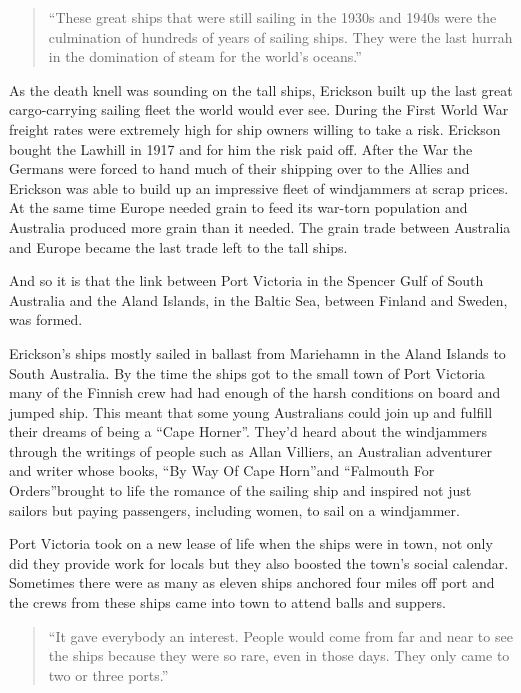 \documentclass[
  11pt,
  msmallroyalvopaper
]{memoir}
\begin{document}
\begin{quote}
“These great ships that were still sailing in the 1930s and 1940s were the culmination of
hundreds of years of sailing ships. They were the last hurrah in the domination of steam
for the world’s oceans.” 
\end{quote}

As the death knell was sounding on the tall ships, Erickson built up the
last great cargo-carrying sailing fleet the world would ever see.
During the First World War freight rates were extremely high for ship
owners willing to take a risk. Erickson bought the Lawhill in 1917 and
for him the risk paid off. After the War the Germans were forced to hand
much of their shipping over to the Allies and Erickson was able to build
up an impressive fleet of windjammers at scrap prices. At the same time
Europe needed grain to feed its war-torn population and Australia
produced more grain than it needed. The grain trade between Australia
and Europe became the last trade left to the tall ships.

And so it is that the link between Port Victoria in the Spencer Gulf of
South Australia and the Aland Islands, in the Baltic Sea, between
Finland and Sweden, was formed.

Erickson’s ships mostly sailed in ballast from Mariehamn in the Aland
Islands to South Australia. By the time the ships got to the small town
of Port Victoria many of the Finnish crew had had enough of the harsh
conditions on board and jumped ship. This meant that some young
Australians could join up and fulfill their dreams of being a “Cape
Horner”. They’d heard about the windjammers through the writings of
people such as Allan Villiers, an Australian adventurer and writer whose
books, “By Way Of Cape Horn”and “Falmouth For Orders”brought to life the
romance of the sailing ship and inspired not just sailors but paying
passengers, including women, to sail on a windjammer.

Port Victoria took on a new lease of life when the ships were in town,
not only did they provide work for locals but they also boosted the
town’s social calendar. Sometimes there were as many as eleven ships
anchored four miles off port and the crews from these ships came into
town to attend balls and suppers.

\begin{quote}
“It gave everybody an interest. People would come from far and near to
see the ships because they were so rare, even in those days. They only
came to two or three ports.”
\end{quote}
\end{document}
